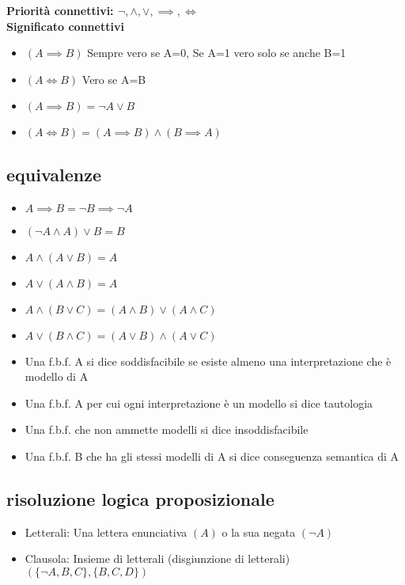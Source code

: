 \documentclass{article}
\begin{document}
\begin{multicols*}{3}
 		\textbf{ Priorità connettivi: \(\neg, \land, \lor, \implies, \iff \)}\\
 		\textbf{Significato connettivi}
 		\begin{itemize}
 			\setlength\itemsep{0.1mm}
 			\item \( (A\implies B) \) Sempre vero se A=0, Se A=1 vero solo se anche B=1
 			\item \( (A\iff B) \) Vero se A=B
 			\item  \( (A\implies B) = \neg A \lor B\)
 			\item \( (A\iff B) = (A\implies B)\land(B\implies A) \) 
 		\end{itemize}
 		\subsection{equivalenze}
 		\begin{itemize}
 			\setlength\itemsep{0.1mm}
 			\item \(A\implies B = \neg B \implies \neg A\)
 			\item \((\neg A \land A)\lor B = B\)
 			\item \(A \land (A \lor B) = A\)
 			\item \(A \lor (A \land B) = A\)
 			\item \(A \land (B \lor C) = (A \land B) \lor (A \land C)\)
 			\item \(A \lor (B \land C) = (A \lor B) \land (A \lor C)\)
 		\end{itemize}
 		
 		\begin{itemize}
 			\setlength\itemsep{0.1mm}
 			\item Una f.b.f. A si dice soddisfacibile se esiste almeno una interpretazione che è modello di A
 			\item Una f.b.f. A per cui ogni interpretazione è un modello si dice tautologia
 			\item Una f.b.f. che non ammette modelli si dice insoddisfacibile 
 			\item Una f.b.f. B che ha gli stessi modelli di A si dice conseguenza semantica di A
 		\end{itemize}
 		
 		\subsection{risoluzione logica proposizionale}
 		
 		\begin{itemize}
 			\setlength\itemsep{0.1mm}
 			\item Letterali: Una lettera enunciativa \((A)\) o la sua negata \((\neg A)\)
 			\item Clausola: Insieme di letterali (disgiunzione di letterali) \( (\{\neg A,B,C\},\{B,C,D\}) \)
 		\end{itemize}
 		

\end{multicols*}
\end{document}
